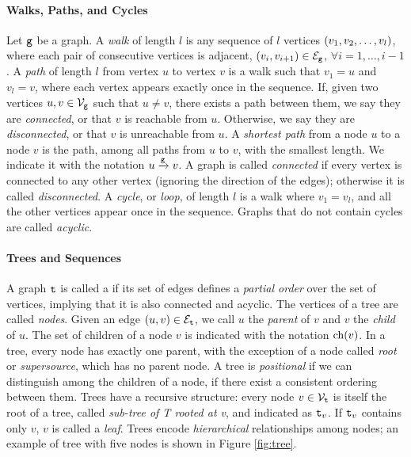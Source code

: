 \paragraph{Walks, Paths, and Cycles}
Let $\mathtt{g}$ be a graph. A \emph{walk} of length $l$ is any sequence of $l$ vertices $\left( v_1, v_2, \ldots, v_l \right)$, where each pair of consecutive vertices is adjacent, \ie $\Par{v_i, v_{i+1}} \in \Edges_{\Graph{g}}$, $\forall i= 1, \ldots, i-1$. A \emph{path} of length $l$ from vertex $u$ to vertex $v$ is a walk such that $v_1 = u$ and $v_l = v$, where each vertex appears exactly once in the sequence. If, given two vertices $u, v \in \Nodes_{\Graph{g}}$ such that $u \neq v$, there exists a path between them, we say they are \emph{connected}, or that $v$ is reachable from $u$. Otherwise, we say they are \emph{disconnected}, or that $v$ is unreachable from $u$. A \emph{shortest path} from a node $u$ to a node $v$ is the path, among all paths from $u$ to $v$, with the smallest length. We indicate it with the notation $u \xrightarrow[]{\mathtt{g}} v$. A graph is called \emph{connected} if every vertex is connected to any other vertex (ignoring the direction of the edges); otherwise it is called \emph{disconnected}. A \emph{cycle}, or \emph{loop}, of length $l$ is a walk where $v_1 = v_l$, and all the other vertices appear once in the sequence. Graphs that do not contain cycles are called \emph{acyclic}.

\paragraph{Trees and Sequences}
A graph $\mathtt{t}$ is called a  if its set of edges defines a \emph{partial order} over the set of vertices, implying that it is also connected and acyclic. The vertices of a tree are called \emph{nodes}. Given an edge $(u, v) \in \Edges_{\Tree}$, we call $u$ the \emph{parent} of $v$ and $v$ the \emph{child} of $u$. The set of children of a node $v$ is indicated with the notation $\mathrm{ch}(v)$. In a tree, every node has exactly one parent, with the exception of a node called \emph{root} or \emph{supersource}, which has no parent node. A tree is \emph{positional} if we can distinguish among the children of a node, \ie if there exist a consistent ordering between them. Trees have a recursive structure: every node $v \in \Nodes_{\Tree}$ is itself the root of a tree, called \emph{sub-tree of T rooted at v}, and indicated as $\mathtt{t}_v$. If $\mathtt{t}_v$ contains only $v$, $v$ is called a \emph{leaf}. Trees encode \emph{hierarchical} relationships among nodes; an example of tree with five nodes is shown in Figure \ref{fig:tree}.

